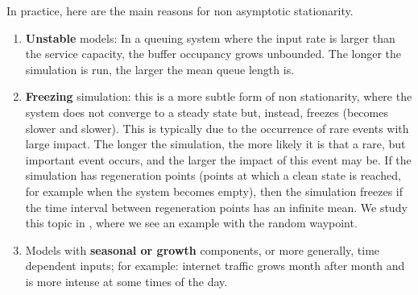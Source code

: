 In practice, here are the main reasons for non asymptotic
stationarity.\begin{enumerate}
    \item \textbf{Unstable} models: In a
        queuing system where the input rate is larger than the
        service capacity, the buffer occupancy grows unbounded. The longer the simulation is run, the
        larger the mean queue length is.

    \item \textbf{Freezing} simulation: this is a more subtle form
of non stationarity, where the system does not converge to a
steady state but, instead, freezes (becomes slower and slower).
This is typically due to the occurrence of rare events with
large impact. The longer the simulation, the more likely it is
that a rare, but important event occurs, and the larger the
impact of this event may be. If the simulation has regeneration
points (points at which a clean state is reached, for example
when the system becomes empty), then the simulation freezes if
the time interval between regeneration points has an infinite
mean. We study this topic in , where we see an
example with the random waypoint.

\item Models with \textbf{seasonal or growth} components, or
    more generally, time dependent inputs;
        for example: internet traffic grows month after month and is more intense at some times of the
        day. %
\end{enumerate}

